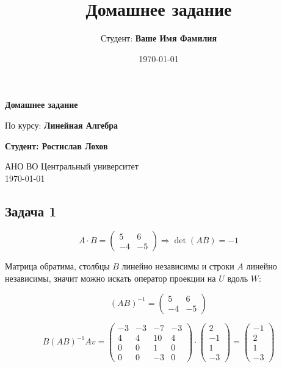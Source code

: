 \documentclass[a4paper,12pt]{article}
\title{Домашнее задание}
\author{Студент: \textbf{Ваше Имя Фамилия}}
\date{\today}
\begin{document}
\begin{titlepage}
    \centering
    \vspace*{1cm}

    \Huge
    \textbf{Домашнее задание}

    \vspace{0.5cm}
    \LARGE
    По курсу: \textbf{Линейная Алгебра}

    \vspace{1.5cm}

    \textbf{Студент: Ростислав Лохов}

    \vfill

    \Large
    АНО ВО Центральный университет\\
    \vspace{0.3cm}
    \today

\end{titlepage}

\tableofcontents
\newpage

\subsection{Задача 1}

\[
A\cdot B = \begin{pmatrix}
    5 & 6 \\
    -4 & -5
\end{pmatrix} \Rightarrow \det(AB) = -1
\]

Матрица обратима, столбцы \( B \) линейно независимы и строки \( A \) линейно независимы, значит можно искать оператор проекции на \( U \) вдоль \( W \):

\[
(AB)^{-1} = \begin{pmatrix}
    5 & 6 \\
    -4 & -5
\end{pmatrix}
\]

\[
B(AB)^{-1}Av = \begin{pmatrix}
    -3 & -3 & -7 & -3 \\
    4 & 4 & 10 & 4 \\
    0 & 0 & 1 & 0 \\
    0 & 0 & -3 & 0
\end{pmatrix} \cdot \begin{pmatrix}
    2 \\
    -1 \\
    1 \\
    -3
\end{pmatrix} = \begin{pmatrix}
    -1 \\
    2 \\
    1 \\
    -3
\end{pmatrix}
\]
\end{document}
